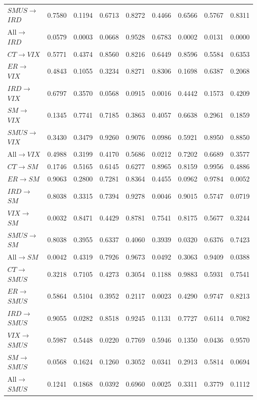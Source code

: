 \documentclass[a4paper, twoside]{templates/ociamthesis}
\begin{document}
\begin{table}[H]
{\begin{tabular}[t]{lcccccccc}
$SMUS$$\rightarrow$$IRD$ & 0.7580 & 0.1194 & 0.6713 & 0.8272 & 0.4466 & 0.6566 & 0.5767 & 0.8311\\
All$\rightarrow$$IRD$ & 0.0579 & 0.0003 & 0.0668 & 0.9528 & 0.6783 & 0.0002 & 0.0131 & 0.0000\\
\addlinespace
$CT$$\rightarrow$$VIX$ & 0.5771 & 0.4374 & 0.8560 & 0.8216 & 0.6449 & 0.8596 & 0.5584 & 0.6353\\
$ER$$\rightarrow$$VIX$ & 0.4843 & 0.1055 & 0.3234 & 0.8271 & 0.8306 & 0.1698 & 0.6387 & 0.2068\\
$IRD$$\rightarrow$$VIX$ & 0.6797 & 0.3570 & 0.0568 & 0.0915 & 0.0016 & 0.4442 & 0.1573 & 0.4209\\
$SM$$\rightarrow$$VIX$ & 0.1345 & 0.7741 & 0.7185 & 0.3863 & 0.4057 & 0.6638 & 0.2961 & 0.1859\\
$SMUS$$\rightarrow$$VIX$ & 0.3430 & 0.3479 & 0.9260 & 0.9076 & 0.0986 & 0.5921 & 0.8950 & 0.8850\\
All$\rightarrow$$VIX$ & 0.4988 & 0.3199 & 0.4170 & 0.5686 & 0.0212 & 0.7202 & 0.6689 & 0.3577\\
\addlinespace
$CT$$\rightarrow$$SM$ & 0.1746 & 0.5165 & 0.6145 & 0.6277 & 0.8965 & 0.8159 & 0.9956 & 0.4886\\
$ER$$\rightarrow$$SM$ & 0.9063 & 0.2800 & 0.7281 & 0.8364 & 0.4455 & 0.0962 & 0.9784 & 0.0052\\
$IRD$$\rightarrow$$SM$ & 0.8038 & 0.3315 & 0.7394 & 0.9278 & 0.0046 & 0.9015 & 0.5747 & 0.0719\\
$VIX$$\rightarrow$$SM$ & 0.0032 & 0.8471 & 0.4429 & 0.8781 & 0.7541 & 0.8175 & 0.5677 & 0.3244\\
$SMUS$$\rightarrow$$SM$ & 0.8038 & 0.3955 & 0.6337 & 0.4060 & 0.3939 & 0.0320 & 0.6376 & 0.7423\\
All$\rightarrow$$SM$ & 0.0042 & 0.4319 & 0.7926 & 0.9673 & 0.0492 & 0.3063 & 0.9409 & 0.0388\\
\addlinespace
$CT$$\rightarrow$$SMUS$ & 0.3218 & 0.7105 & 0.4273 & 0.3054 & 0.1188 & 0.9883 & 0.5931 & 0.7541\\
$ER$$\rightarrow$$SMUS$ & 0.5864 & 0.5104 & 0.3952 & 0.2117 & 0.0023 & 0.4290 & 0.9747 & 0.8213\\
$IRD$$\rightarrow$$SMUS$ & 0.9055 & 0.0282 & 0.8518 & 0.9245 & 0.1131 & 0.7727 & 0.6114 & 0.7082\\
$VIX$$\rightarrow$$SMUS$ & 0.5987 & 0.5448 & 0.0220 & 0.7769 & 0.5946 & 0.1350 & 0.0436 & 0.9570\\
$SM$$\rightarrow$$SMUS$ & 0.0568 & 0.1624 & 0.1260 & 0.3052 & 0.0341 & 0.2913 & 0.5814 & 0.0694\\
All$\rightarrow$$SMUS$ & 0.1241 & 0.1868 & 0.0392 & 0.6960 & 0.0025 & 0.3311 & 0.3779 & 0.1112\\
\bottomrule
\end{tabular}}
\end{table}
\end{document}
